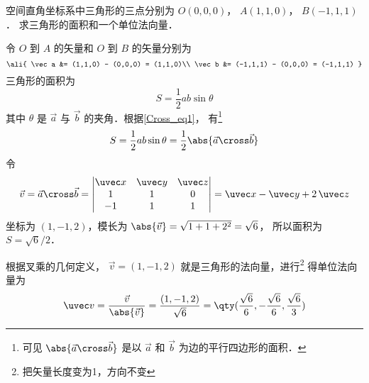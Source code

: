 \begin{exam}{}\label{Cross_exe1}
空间直角坐标系中三角形的三点分别为 $O(0,0,0)$，  $A(1,1,0)$，  $B(-1,1,1)$． 求三角形的面积和一个单位法向量．

令 $O$ 到 $A$ 的矢量和  $O$ 到 $B$ 的矢量分别为
\begin{equation}
\ali{
\vec a  &= (1,1,0) - (0,0,0) = (1,1,0)\\
\vec b  &= (-1,1,1) - (0,0,0) = (-1,1,1)
}\end{equation}
三角形的面积为
 \begin{equation}
S = \frac12 ab \sin \theta 
\end{equation}
其中 $\theta $ 是 $\vec a$ 与 $\vec b$ 的夹角．根据\autoref{Cross_eq1}， 有\footnote{可见 $\abs{\vec a\cross\vec b}$ 是以 $\vec a$ 和 $\vec b$ 为边的平行四边形的面积．}
\begin{equation}
S = \frac12 ab \sin \theta  = \frac12 \abs{\vec a\cross\vec b}
\end{equation}
令
\begin{equation}
\vec v = \vec a \cross \vec b = 
\begin{vmatrix} \uvec x & \uvec y & \uvec z \\ 1&1&0\\-1&1&1 \end{vmatrix}
= \uvec x - \uvec y + 2\,\uvec z 
\end{equation}
坐标为 $(1,-1,2)$，模长为 $\abs{\vec v} = \sqrt{1 + 1 + 2^2} = \sqrt 6$， 所以面积为 $S = \sqrt 6 /2$． 

根据叉乘的几何定义， $\vec v = (1,-1,2)$ 就是三角形的法向量，进行\footnote{把矢量长度变为1，方向不变}
得单位法向量为
 \begin{equation}
\uvec v = \frac{\vec v}{\abs{\vec v}} = \frac{(1,-1,2)}{\sqrt 6} = \qty( \frac{\sqrt 6 }{6}, - \frac{\sqrt 6 }{6}, \frac{\sqrt 6 }{3} )
\end{equation}
\end{exam}



